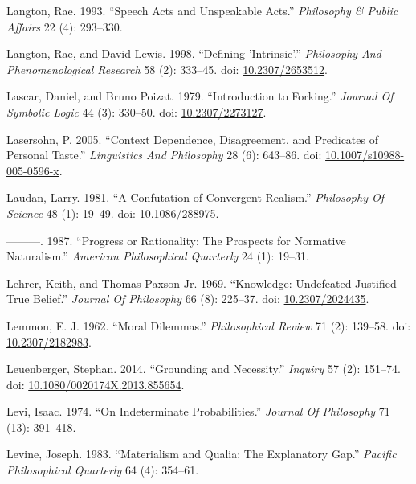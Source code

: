 \documentclass[
  10pt,
  letterpaper,
  DIV=11,
  numbers=noendperiod,
  twoside]{scrartcl}
\newlength{\cslhangindent}
\newenvironment{CSLReferences}[2] %
 {\begin{list}{}{%
  \setlength{\itemindent}{0pt}
  \setlength{\leftmargin}{0pt}
  \setlength{\parsep}{0pt}
  \ifodd #1
   \setlength{\leftmargin}{\cslhangindent}
   \setlength{\itemindent}{-1\cslhangindent}
  \fi
  \setlength{\itemsep}{#2\baselineskip}}}
 {\end{list}}
\begin{document}
\begin{CSLReferences}{1}{0}
Langton, Rae. 1993. {``Speech Acts and Unspeakable Acts.''}
\emph{Philosophy \& Public Affairs} 22 (4): 293--330.

Langton, Rae, and David Lewis. 1998. {``Defining 'Intrinsic'.''}
\emph{Philosophy And Phenomenological Research} 58 (2): 333--45. doi:
\href{https://doi.org/10.2307/2653512}{10.2307/2653512}.

Lascar, Daniel, and Bruno Poizat. 1979. {``Introduction to Forking.''}
\emph{Journal Of Symbolic Logic} 44 (3): 330--50. doi:
\href{https://doi.org/10.2307/2273127}{10.2307/2273127}.

Lasersohn, P. 2005. {``Context Dependence, Disagreement, and Predicates
of Personal Taste.''} \emph{Linguistics And Philosophy} 28 (6): 643--86.
doi:
\href{https://doi.org/10.1007/s10988-005-0596-x}{10.1007/s10988-005-0596-x}.

Laudan, Larry. 1981. {``A Confutation of Convergent Realism.''}
\emph{Philosophy Of Science} 48 (1): 19--49. doi:
\href{https://doi.org/10.1086/288975}{10.1086/288975}.

---------. 1987. {``Progress or Rationality: The Prospects for Normative
Naturalism.''} \emph{American Philosophical Quarterly} 24 (1): 19--31.

Lehrer, Keith, and Thomas Paxson Jr. 1969. {``Knowledge: Undefeated
Justified True Belief.''} \emph{Journal Of Philosophy} 66 (8): 225--37.
doi: \href{https://doi.org/10.2307/2024435}{10.2307/2024435}.

Lemmon, E. J. 1962. {``Moral Dilemmas.''} \emph{Philosophical Review} 71
(2): 139--58. doi:
\href{https://doi.org/10.2307/2182983}{10.2307/2182983}.

Leuenberger, Stephan. 2014. {``Grounding and Necessity.''}
\emph{Inquiry} 57 (2): 151--74. doi:
\href{https://doi.org/10.1080/0020174X.2013.855654}{10.1080/0020174X.2013.855654}.

Levi, Isaac. 1974. {``On Indeterminate Probabilities.''} \emph{Journal
Of Philosophy} 71 (13): 391--418.

Levine, Joseph. 1983. {``Materialism and Qualia: The Explanatory Gap.''}
\emph{Pacific Philosophical Quarterly} 64 (4): 354--61.


\end{CSLReferences}
\end{document}

